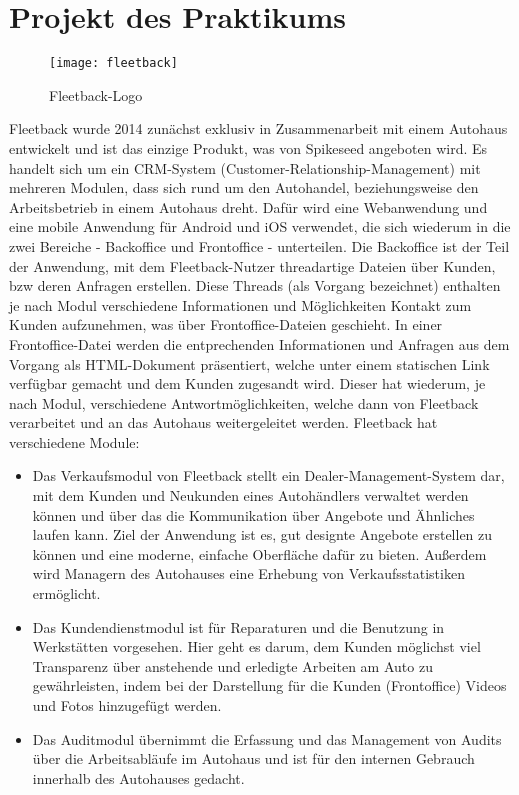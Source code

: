 \documentclass[a4paper, 11pt]{article}
\begin{document}
\section{Projekt des Praktikums}
\begin{figure}[hb!]
  \centering
  \texttt{[image: fleetback]}
  \caption[Fleetback-Logo]{Fleetback-Logo\protect\footnotemark}
\end{figure}

Fleetback wurde 2014 zunächst exklusiv in Zusammenarbeit mit einem Autohaus entwickelt und ist das einzige Produkt, was von Spikeseed angeboten wird. Es handelt sich um ein CRM-System (Customer-Relationship-Management) mit mehreren Modulen, dass sich rund um den Autohandel, beziehungsweise den Arbeitsbetrieb in einem Autohaus dreht. Dafür wird eine Webanwendung und eine mobile Anwendung für Android und iOS verwendet, die sich wiederum in die zwei Bereiche - Backoffice und Frontoffice - unterteilen. Die Backoffice ist der Teil der Anwendung, mit dem Fleetback-Nutzer threadartige Dateien über Kunden, bzw deren Anfragen erstellen. Diese Threads (als Vorgang bezeichnet) enthalten je nach Modul verschiedene Informationen und Möglichkeiten Kontakt zum Kunden aufzunehmen, was über Frontoffice-Dateien geschieht. In einer Frontoffice-Datei werden die entprechenden Informationen und Anfragen aus dem Vorgang als HTML-Dokument präsentiert, welche unter einem statischen Link verfügbar gemacht und dem Kunden zugesandt wird. Dieser hat wiederum, je nach Modul, verschiedene Antwortmöglichkeiten, welche dann von Fleetback verarbeitet und an das Autohaus weitergeleitet werden.
Fleetback hat verschiedene Module:
\begin{itemize}
    \item Das Verkaufsmodul von Fleetback stellt ein Dealer-Management-System dar, mit dem Kunden und Neukunden eines Autohändlers verwaltet werden können und über das die Kommunikation über Angebote und Ähnliches laufen kann. Ziel der Anwendung ist es, gut designte Angebote erstellen zu können und eine moderne, einfache Oberfläche dafür zu bieten. Außerdem wird Managern des Autohauses eine Erhebung von Verkaufsstatistiken ermöglicht.
    \item Das Kundendienstmodul ist für Reparaturen und die Benutzung in Werkstätten vorgesehen. Hier geht es darum, dem Kunden möglichst viel Transparenz über anstehende und erledigte Arbeiten am Auto zu gewährleisten, indem bei der Darstellung für die Kunden (Frontoffice) Videos und Fotos hinzugefügt werden.
    \item Das Auditmodul übernimmt die Erfassung und das Management von Audits über die Arbeitsabläufe im Autohaus und ist für den internen Gebrauch innerhalb des Autohauses gedacht.
\end{itemize}
\end{document}
